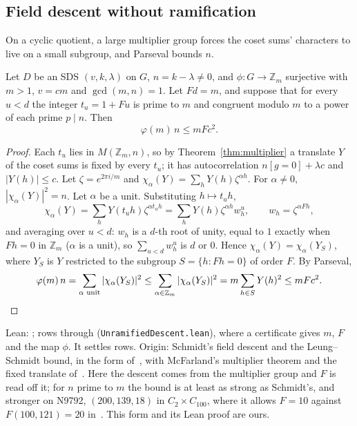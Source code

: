 \subsection{Field descent without ramification}

On a cyclic quotient, a large multiplier group forces the coset sums' characters to live on a
small subgroup, and Parseval bounds $n$.

\begin{theorem}\label{thm:z30}
Let $D$ be an SDS $(v, k, \lambda)$ on $G$, $n = k - \lambda \neq 0$, and
$\phi \colon G \to \mathbb{Z}_m$ surjective with $m > 1$, $v = cm$ and $\gcd(m, n) = 1$. Let
$Fd = m$, and suppose that for every $u < d$ the integer $t_u = 1 + Fu$ is prime to $m$ and
congruent modulo $m$ to a power of each prime $p \mid n$. Then
\[
  \varphi(m)\, n \le m F c^2 .
\]
\end{theorem}

\begin{proof}
Each $t_u$ lies in $M(\mathbb{Z}_m, n)$, so by Theorem~\ref{thm:multiplier} a translate $Y$ of
the coset sums is fixed by every $t_u$; it has autocorrelation $n[g=0] + \lambda c$ and
$|Y(h)| \le c$. Let $\zeta = e^{2\pi i/m}$ and $\chi_\alpha(Y) = \sum_h Y(h)\zeta^{\alpha h}$. For
$\alpha \neq 0$, $|\chi_\alpha(Y)|^2 = n$. Let $\alpha$ be a unit. Substituting $h \mapsto t_u h$,
\[
  \chi_\alpha(Y) = \sum_h Y(t_u h)\zeta^{\alpha t_u h} = \sum_h Y(h)\zeta^{\alpha h} w_h^u,
  \qquad w_h = \zeta^{\alpha F h},
\]
and averaging over $u < d$: $w_h$ is a $d$-th root of unity, equal to $1$ exactly when
$Fh = 0$ in $\mathbb{Z}_m$ ($\alpha$ is a unit), so $\sum_{u<d} w_h^u$ is $d$ or $0$. Hence
$\chi_\alpha(Y) = \chi_\alpha(Y_S)$, where $Y_S$ is $Y$ restricted to the subgroup
$S = \{h : Fh = 0\}$ of order $F$. By Parseval,
\[
  \varphi(m)\,n = \sum_{\alpha \text{ unit}} |\chi_\alpha(Y_S)|^2
  \le \sum_{\alpha \in \mathbb{Z}_m} |\chi_\alpha(Y_S)|^2 = m\sum_{h \in S} Y(h)^2 \le mFc^2. \qedhere
\]
\end{proof}

\begin{remark}
Lean: ; rows through 
(\texttt{UnramifiedDescent.lean}), where a certificate gives $m$, $F$ and the map $\phi$. It
settles  rows. Origin: Schmidt's field descent and the Leung--Schmidt bound, in the
form of~\cite[Results~2.11--2.12]{tan}, with McFarland's multiplier theorem and the fixed
translate of~\cite{mcfarland-rice}. Here the descent comes from the multiplier group and $F$ is
read off it; for $n$ prime to $m$ the bound is at least as strong as Schmidt's, and stronger on
N9792, $(200, 139, 18)$ in $C_2 \times C_{100}$, where it allows $F = 10$ against
$F(100, 121) = 20$ in~\cite{tan}. This form and its Lean proof are ours.
\end{remark}

